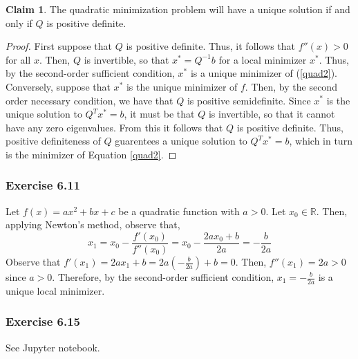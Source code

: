 \documentclass[letterpaper,12pt]{article}
\theoremstyle{definition}
\newtheorem{claim}[theorem]{Claim}
\begin{document}
\begin{claim}
	The quadratic minimization problem will have a unique solution if and only if $Q$ is positive definite. 
\end{claim}
\begin{proof}
	First suppose that $Q$ is positive definite. Thus, it follows that $f''(x) >0$ for all $x$. Then, $Q$ is invertible, so that $x^* = Q^{-1}b$ for a local minimizer $x^*$. Thus, by the second-order sufficient condition, $x^*$ is a unique minimizer of (\ref{quad2}). Conversely, suppose that $x^*$ is the unique minimizer of $f$. Then, by the second order necessary condition, we have that $Q$ is positive semidefinite. Since $x^*$ is the unique solution to $Q^T x^* = b$, it must be that $Q$ is invertible, so that it cannot have any zero eigenvalues. From this it follows that $Q$ is positive definite. Thus, positive definiteness of $Q$ guarentees a unique solution to $Q^T x^* = b$, which in turn is the minimizer of Equation \ref{quad2}.
\end{proof}

\subsubsection*{Exercise 6.11}
Let $f(x) = ax^2 + bx + c$ be a quadratic function with $a > 0$. Let $x_0 \in \mathbb{R}$. Then, applying Newton's method, observe that,
\begin{equation}
	x_1 = x_0 - \frac{f'(x_0)}{f''(x_0)} = x_0 - \frac{2ax_0 + b}{2a} = - \frac{b}{2a}
\end{equation}
Observe that $f'(x_1) = 2a x_1 + b = 2a ( - \frac{b}{2a}) + b = 0$. Then, $f''(x_1) = 2a >0$ since $ a> 0$. Therefore, by the second-order sufficient condition, $x_1 = -\frac{b}{2a}$ is a unique local minimizer.  

\subsubsection*{Exercise 6.15}
See Jupyter notebook.
\end{document}
